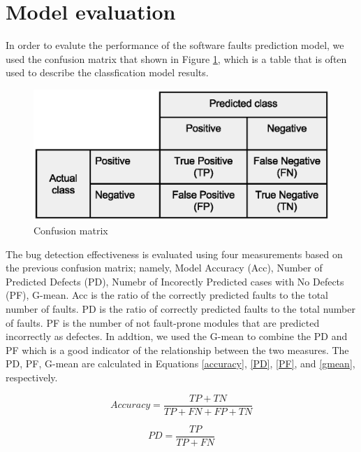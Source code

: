 \documentclass[runningheads,a4paper]{llncs}
\begin{document}
\section{Model evaluation}
\label{evaluation_criteria}
In order to evalute the performance of the software faults prediction model, we used the confusion matrix that shown in Figure \ref{fig:confusion}, which is a table that is often used to describe the classfication model results. 

\begin{figure}[h]
\label{fig:ss}
\begin{center}
\includegraphics[scale=0.5]{confusion-matrix.eps}
\caption{Confusion matrix}
\end{center}
\label{fig:confusion}
\end{figure}

The bug detection effectiveness is evaluated using four measurements based on the previous confusion matrix; namely, Model Accuracy (Acc), Number of Predicted Defects (PD), Numebr of Incorectly Predicted cases with No Defects (PF), G-mean. Acc is the ratio of the correctly predicted faults to the total number of faults. PD is
the ratio of correctly predicted faults to the total number of faults. PF is the number of not fault-prone modules that are predicted incorrectly as defectes. In addtion, we used the G-mean to combine the PD and PF which is a good indicator of the relationship between the two measures. The PD, PF, G-mean are calculated in Equations \ref{accuracy}, \ref{PD}, \ref{PF}, and \ref{gmean}, respectively.

\begin{equation}
Accuracy=\frac{TP+TN}{TP + FN + FP + TN}
\label{accuracy}
\end{equation}

\begin{equation}
PD=\frac{TP}{TP+FN}
\label{PD}
\end{equation}
\end{document}
